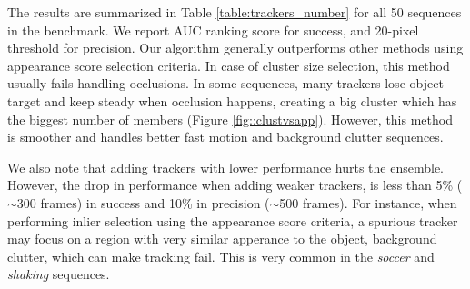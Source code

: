\begin{table}[h!]
\centering
\caption{\small Average AUC and precision for live fusion methods tested in 50 videos
		dataset.}
\label{table:trackers_number}
\end{table}

The results are summarized in Table \ref{table:trackers_number} for all 50
sequences in the benchmark.
We report AUC ranking score for success, 
and 20-pixel threshold for precision.
%
%
Our algorithm generally outperforms other methods using
appearance score selection criteria. In case of cluster size selection,
this method usually fails handling occlusions. In some sequences, many trackers
lose object target and keep steady when occlusion happens, creating a big
cluster which has the biggest number of members (Figure \ref{fig::clustvsapp}).
However, this method is smoother and handles better fast motion and background
clutter sequences.



We also note that adding trackers with lower performance hurts the ensemble.
However, the drop in performance when adding
weaker trackers, is less than 5\% ($\sim$300 frames) in success and 10\% in
precision ($\sim$500 frames). For instance, when performing inlier selection using
the
appearance score criteria, a spurious tracker may focus on a region with
very similar apperance to the object, \eg background clutter, which can
make tracking fail.
This is very common in the \textit{soccer} and \textit{shaking}
sequences.


